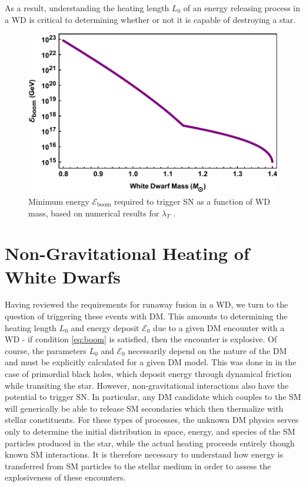 \documentclass[twocolumn,preprintnumbers,amsmath,amssymb,prl, superscriptaddress]{revtex4}
\newcommand{\Ez}{\mathcal{E}_0}
\newcommand{\Eboom}{\mathcal{E}_\text{boom}}
\begin{document}
As a result, understanding the heating length $L_0$ of an energy releasing process in a WD is critical to determining whether or not it is capable of destroying a star.
\begin{figure}
\includegraphics[scale=.45]{Eboom.pdf}
\caption{Minimum energy $\Eboom$ required to trigger SN as a function of WD mass, based on numerical results for $\lambda_T$ \cite{Woosley}.}
\label{fig:Eboom}
\end{figure}

\section{Non-Gravitational Heating of White Dwarfs}
\label{sec:SMHeating}

Having reviewed the requirements for runaway fusion in a WD, we turn to the question of triggering these events with DM.
This amounts to determining the heating length $L_0$ and energy deposit $\Ez$ due to a given DM encounter with a WD - if condition \eqref{eq:boom} is satisfied, then the encounter is explosive.
Of course, the parameters $L_0$ and $\Ez$ necessarily depend on the nature of the DM and must be explicitly calculated for a given DM model.
This was done in \cite{Graham:2015apa} in the case of primordial black holes, which deposit energy through dynamical friction while transiting the star.
However, non-gravitational interactions also have the potential to trigger SN.
In particular, any DM candidate which couples to the SM will generically be able to release SM secondaries which then thermalize with stellar constituents.
For these types of processes, the unknown DM physics serves only to determine the initial distribution in space, energy, and species of the SM particles produced in the star, while the actual heating proceeds entirely though known SM interactions.
It is therefore necessary to understand how energy is transferred from SM particles to the stellar medium in order to assess the explosiveness of these encounters.
\end{document}
